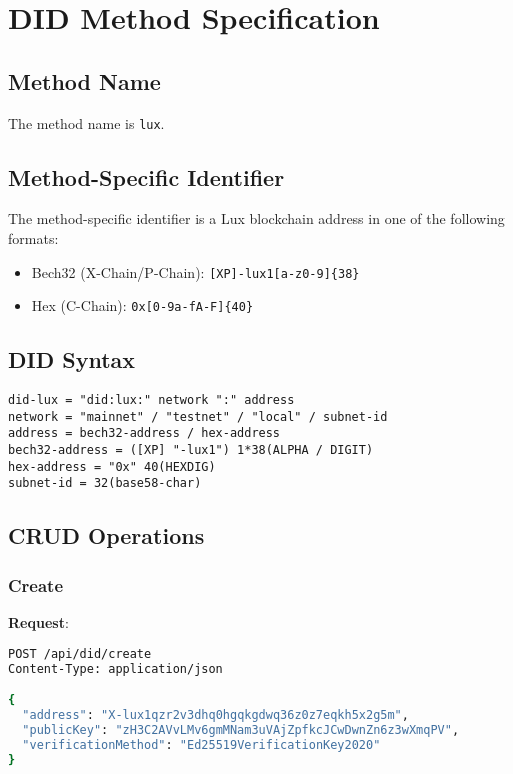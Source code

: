 \documentclass[11pt,a4paper]{article}
\begin{document}
\appendix

\section{DID Method Specification}

\subsection{Method Name}

The method name is \texttt{lux}.

\subsection{Method-Specific Identifier}

The method-specific identifier is a Lux blockchain address in one of the following formats:

\begin{itemize}
  \item Bech32 (X-Chain/P-Chain): \texttt{[XP]-lux1[a-z0-9]\{38\}}
  \item Hex (C-Chain): \texttt{0x[0-9a-fA-F]\{40\}}
\end{itemize}

\subsection{DID Syntax}

\begin{verbatim}
did-lux = "did:lux:" network ":" address
network = "mainnet" / "testnet" / "local" / subnet-id
address = bech32-address / hex-address
bech32-address = ([XP] "-lux1") 1*38(ALPHA / DIGIT)
hex-address = "0x" 40(HEXDIG)
subnet-id = 32(base58-char)
\end{verbatim}

\subsection{CRUD Operations}

\subsubsection{Create}

\textbf{Request}:
\begin{lstlisting}[language=bash]
POST /api/did/create
Content-Type: application/json

{
  "address": "X-lux1qzr2v3dhq0hgqkgdwq36z0z7eqkh5x2g5m",
  "publicKey": "zH3C2AVvLMv6gmMNam3uVAjZpfkcJCwDwnZn6z3wXmqPV",
  "verificationMethod": "Ed25519VerificationKey2020"
}
\end{lstlisting}
\end{document}
